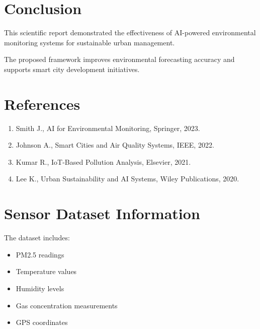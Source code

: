 \documentclass[12pt,a4paper]{article}
\begin{document}
	
	\section{Conclusion}
	
	This scientific report demonstrated the effectiveness of AI-powered environmental monitoring systems for sustainable urban management.
	
	The proposed framework improves environmental forecasting accuracy and supports smart city development initiatives.
	
	
	\section*{References}
	
	\begin{enumerate}
		
		\item Smith J., AI for Environmental Monitoring, Springer, 2023.
		
		\item Johnson A., Smart Cities and Air Quality Systems, IEEE, 2022.
		
		\item Kumar R., IoT-Based Pollution Analysis, Elsevier, 2021.
		
		\item Lee K., Urban Sustainability and AI Systems, Wiley Publications, 2020.
		
	\end{enumerate}
	
	
	\appendix
	
	\section{Sensor Dataset Information}
	
	The dataset includes:
	
	\begin{itemize}
		
		\item PM2.5 readings
		
		\item Temperature values
		
		\item Humidity levels
		
		\item Gas concentration measurements
		
		\item GPS coordinates
		
	\end{itemize}
	
\end{document}

